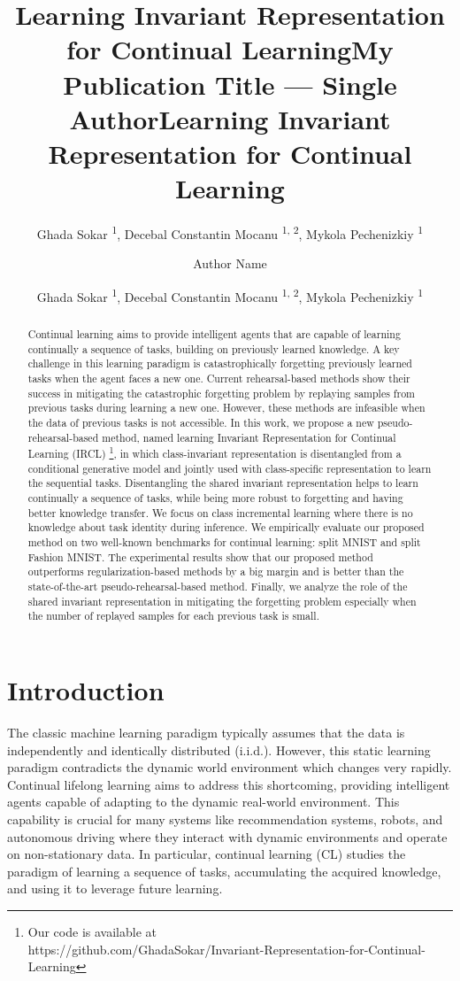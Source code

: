 \documentclass[letterpaper]{article} %
\title{Learning Invariant Representation for Continual Learning}
\author{
    Ghada Sokar \textsuperscript{\rm 1},
    Decebal Constantin Mocanu \textsuperscript{\rm 1, \rm 2},
    Mykola Pechenizkiy \textsuperscript{\rm 1} \\
}
\title{My Publication Title --- Single Author}
\author {
    Author Name \\
}
\title{Learning Invariant Representation for Continual Learning}
\author {
    Ghada Sokar \textsuperscript{\rm 1},
    Decebal Constantin Mocanu \textsuperscript{\rm 1, \rm 2},
    Mykola Pechenizkiy \textsuperscript{\rm 1} \\
}
\begin{document}
\maketitle

\begin{abstract}
Continual learning aims to provide intelligent agents that are capable of learning continually a sequence of tasks, building on previously learned knowledge.
A key challenge in this learning paradigm is catastrophically forgetting previously learned tasks when the agent faces a new one. Current rehearsal-based methods show their success in mitigating the catastrophic forgetting problem by replaying samples from previous tasks during learning a new one. However, these methods are infeasible when the data of previous tasks is not accessible. In this work, we propose a new pseudo-rehearsal-based method, named learning Invariant Representation for Continual Learning (IRCL) \footnote{Our code is available at\\ https://github.com/GhadaSokar/Invariant-Representation-for-Continual-Learning}, in which class-invariant representation is disentangled from a conditional generative model and jointly used with class-specific representation to learn the sequential tasks. Disentangling the shared invariant representation helps to learn continually a sequence of tasks, while being more robust to forgetting and having better knowledge transfer. We focus on class incremental learning where there is no knowledge about task identity during inference. We empirically evaluate our proposed method on two well-known benchmarks for continual learning: split MNIST and split Fashion MNIST. The experimental results show that our proposed method outperforms regularization-based methods by a big margin and is better than the state-of-the-art pseudo-rehearsal-based method. Finally, we analyze the role of the shared invariant representation in mitigating the forgetting problem especially when the number of replayed samples for each previous task is small.
\end{abstract}

\section{Introduction}
 The classic machine learning paradigm typically assumes that the data is independently and identically distributed (i.i.d.). However, this static learning paradigm contradicts the dynamic world environment which changes very rapidly. Continual lifelong learning aims to address this shortcoming, providing intelligent agents capable of adapting to the dynamic real-world environment. This capability is crucial for many systems like recommendation systems, robots, and autonomous driving where they interact with dynamic environments and operate on non-stationary data. In particular, continual learning (CL) studies the paradigm of learning a sequence of tasks, accumulating the acquired knowledge, and using it to leverage future learning.
\end{document}

